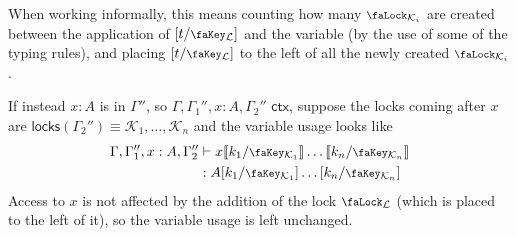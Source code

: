 \documentclass[10pt]{article}
\theoremstyle{definition}
\let\oldequiv\equiv%
\renewcommand{\equiv}{\simeq}
\newcommand{\defeq}{\oldequiv}
\newcommand{\yields}{\vdash}
\newcommand{\ctx}{\,\,\mathsf{ctx}}
\newcommand{\lock}{\mathchoice {\scalebox{0.8}{\text{\faLock}}}
  {\scalebox{0.8}{\text{\faLock}}} {\scalebox{0.5}{\text{\faLock}}}
  {\scalebox{0.4}{\text{\faLock}}} }
\newcommand{\key}{\mathchoice
  {\scalebox{0.8}{\text{\faKey}}} {\scalebox{0.8}{\text{\faKey}}}
  {\scalebox{0.5}{\text{\faKey}}} {\scalebox{0.4}{\text{\faKey}}} }
\newcommand{\lockn}[1]{\mathcal{#1}}
\newcommand{\locksin}[1]{\mathsf{locks}(#1)}
\newcommand{\ctxlocke}[1]{\lock_{#1}}
\newcommand{\ctxlock}[1]{\ctxlocke{\lockn{#1}}}
\newcommand{\stubra}[1]{\llbracket #1 \rrbracket}
\newcommand{\admbra}[1]{[ #1 ]}
\newcommand{\subkeye}[2]{\admbra{#1/\key_{#2}}}
\newcommand{\subkey}[2]{\subkeye{#1}{\lockn{#2}}}
\newcommand{\substucke}[2]{\stubra{#1/\key_{#2}}}
\begin{document}
\begin{itemize}
  When working informally, this means counting how many
  $\ctxlocke{\lockn{K}_i}$ are created between the application of
  $\subkey{t}{L}$ and the variable (by the use of some of the typing
  rules), and placing $\subkey{t}{L}$ to the left of all the newly
  created $\ctxlocke{\lockn{K}_i}$.

  If instead $x : A$ is in $\Gamma''$, so
  $\Gamma, \Gamma_1'', x : A, \Gamma_2'' \ctx$, suppose the locks
  coming after $x$ are
  $\locksin{\Gamma_2''} \defeq \lockn{K}_{1}, \dots, \lockn{K}_n$ and
  the variable usage looks like
  \begin{align*}
    \Gamma, \Gamma_1'', x : A, \Gamma_2''
    &\yields x \substucke{k_1}{\lockn{K}_1} \dots \substucke{k_n}{\lockn{K}_n} \\
    &: A\subkeye{k_1}{\lockn{K}_1} \dots \subkeye{k_n}{\lockn{K}_n}
  \end{align*}
  Access to $x$ is not affected by the addition of the lock
  $\ctxlock{L}$ (which is placed to the left of it), so the variable
  usage is left unchanged.


\end{itemize}
\end{document}
